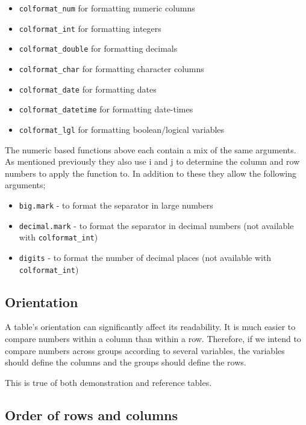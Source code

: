 \documentclass[
]{book}
\providecommand{\tightlist}{%
  \setlength{\itemsep}{0pt}\setlength{\parskip}{0pt}}
\begin{document}
\begin{itemize}
\tightlist
\item
  \texttt{colformat\_num} for formatting numeric columns
\item
  \texttt{colformat\_int} for formatting integers
\item
  \texttt{colformat\_double} for formatting decimals
\item
  \texttt{colformat\_char} for formatting character columns
\item
  \texttt{colformat\_date} for formatting dates
\item
  \texttt{colformat\_datetime} for formatting date-times
\item
  \texttt{colformat\_lgl} for formatting boolean/logical variables
\end{itemize}

The numeric based functions above each contain a mix of the same arguments. As mentioned previously they also use i and j to determine the column and row numbers to apply the function to. In addition to these they allow the following arguments;

\begin{itemize}
\tightlist
\item
  \texttt{big.mark} - to format the separator in large numbers
\item
  \texttt{decimal.mark} - to format the separator in decimal numbers (not available with \texttt{colformat\_int})
\item
  \texttt{digits} - to format the number of decimal places (not available with \texttt{colformat\_int})
\end{itemize}

\hypertarget{orientation}{%
\subsection{Orientation}\label{orientation}}

A table's orientation can significantly affect its readability. It is much easier to compare numbers within a column than within a row. Therefore, if we intend to compare numbers across groups according to several variables, the variables should define the columns and the groups should define the rows.

This is true of both demonstration and reference tables.

\hypertarget{order-of-rows-and-columns}{%
\subsection{Order of rows and columns}\label{order-of-rows-and-columns}}
\end{document}
